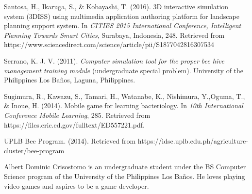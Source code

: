 \documentclass[journal]{./IEEE/IEEEtran}
\begin{document}
\begin{thebibliography}{13}
Santosa, H., Ikaruga, S., & Kobayashi, T. (2016). 3D interactive simulation system (3DISS) using multimedia application authoring platform for landscape planning support system. In \textit{CITIES 2015 International Conference, Intelligent Planning Towards Smart Cities}, Surabaya, Indonesia, 248. Retrieved from https://www.sciencedirect.com/science/article/pii/S1877042816307534

Serrano, K. J. V. (2011). \textit{Computer simulation tool for the proper bee hive management training module} (undergraduate special problem). University of the Philippines Los Baños, Laguna, Philippines.

Sugimura,  R., Kawazu, S., Tamari,  H., Watanabe,  K., Nishimura, Y.,Oguma,  T., & Inoue,  H.  (2014). Mobile game for learning bacteriology. In \textit{10th International Conference Mobile Learning}, 285. Retrieved from https://files.eric.ed.gov/fulltext/ED557221.pdf.

UPLB Bee Program. (2014). Retrieved from https://idsc.uplb.edu.ph/agriculture-cluster/bee-program
\end{thebibliography}

\begin{biography}{Albert Dominic Crisostomo}
is an undergraduate student under the BS Computer Science program of the University of the Philippines Los Ba\~{n}os. He loves playing video games and aspires to be a game developer.
\end{biography}
\end{document}
